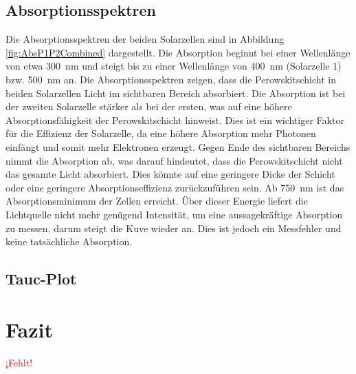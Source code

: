 \documentclass[12pt,a4paper,ngerman]{report}
\providecommand{\fehlt}{\textcolor{red}{{ ¡Fehlt! }}}
\begin{document}
	\section{Absorptionsspektren}
		Die Absorptionsspektren der beiden Solarzellen sind in Abbildung \ref{fig:AbsP1P2Combined} dargestellt. Die Absorption beginnt bei einer Wellenlänge von etwa \SI{300}{\nano\meter} und steigt bis zu einer Wellenlänge von \SI{400}{\nano\meter} (Solarzelle 1) bzw. \SI{500}{\nano\meter} an. Die Absorptionsspektren zeigen, dass die Perowskitschicht in beiden Solarzellen Licht im sichtbaren Bereich absorbiert. Die Absorption ist bei der zweiten Solarzelle stärker als bei der ersten, was auf eine höhere Absorptionsfähigkeit der Perowskitschicht hinweist. Dies ist ein wichtiger Faktor für die Effizienz der Solarzelle, da eine höhere Absorption mehr Photonen einfängt und somit mehr Elektronen erzeugt.
		Gegen Ende des sichtbaren Bereichs nimmt die Absorption ab, was darauf hindeutet, dass die Perowskitschicht nicht das gesamte Licht absorbiert. Dies könnte auf eine geringere Dicke der Schicht oder eine geringere Absorptionseffizienz zurückzuführen sein.
		Ab \SI{750}{\nano\meter} ist das Absorptionsminimum der Zellen erreicht. Über dieser Energie liefert die Lichtquelle nicht mehr genügend Intensität, um eine aussagekräftige Absorption zu messen, darum steigt die Kuve wieder an. Dies ist jedoch ein Messfehler und keine tatsächliche Absorption.		

	\section{Tauc-Plot}


\chapter{Fazit}
	\fehlt

\listoffigures%
	
\end{document}
